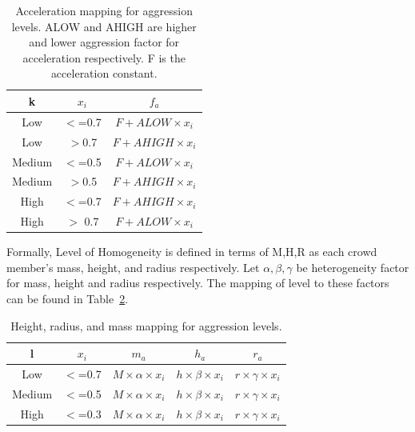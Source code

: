\begin{table}
\centering
	\begin{tabular}{||c c c ||} 
	\hline
	k & $x_{i}$ & $f_{a}$\\ [0.5ex] 
	\hline\hline
	Low & $<$=0.7 & $F+ ALOW\times x_{i}$ \\ 
	\hline
	Low & $>$0.7 & $ F+ AHIGH\times x_{i} $\\
	\hline
	Medium & $<$=0.5 & $F+ ALOW\times x_{i}$ \\
	\hline
	Medium & $>$0.5 & $F+ AHIGH\times x_{i}$\\
	\hline
	High & $<$=0.7 & $F+ AHIGH\times x_{i} $\\
	\hline
	High & $>$ 0.7 & $F+ ALOW\times x_{i}$\\
	\hline
	\end{tabular}
	\caption{\label{table:aggression-levels-accels} Acceleration mapping for aggression levels. ALOW and AHIGH are higher and lower aggression factor for acceleration respectively. F is the acceleration constant.}
\end{table}

Formally, Level of Homogeneity is defined in terms of M,H,R as each crowd member's mass, height, and radius respectively. 
Let $ \alpha , \beta, \gamma $ be heterogeneity factor for mass, height and radius respectively.  The mapping of level to these factors can be found in Table~\ref{table:homogeneity-levels}.

\begin{table}
\centering
	\begin{tabular}{||c c c c c||} 
	\hline
	l & $x_{i}$ & $m_{a}$ & $h_{a}$ & $r_{a}$\\ [0.5ex] 
	\hline\hline
	Low & $<$=0.7 & $M\times \alpha \times x_{i} $ & $h\times \beta \times x_{i}$ & $r\times \gamma \times x_{i} $ \\ 
	\hline
	Medium & $<$=0.5 & $ M\times \alpha \times x_{i}$ & $h\times \beta \times x_{i}$ & $r\times \gamma \times x_{i}$\\
	\hline
	High & $<$=0.3 & $M\times \alpha \times x_{i}$ & $h\times \beta \times x_{i} $ & $r\times \gamma \times x_{i} $\\
	\hline
	\end{tabular}
	\caption{\label{table:homogeneity-levels} Height, radius, and mass mapping for aggression levels.}
\end{table}